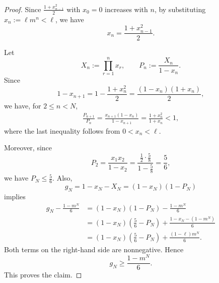 \documentclass[10pt,a4paper]{amsart}
\begin{document}
\begin{proof}
Since $\frac{1+x_{n-1}^2}{2}$ with $x_0=0$ increases with $n$, by substituting $x_n:=\ell m^n < \ell $, we have
\[
x_n
=\frac{1+x_{n-1}^2}{2}.
\]

Let
\[
X_n:=\prod_{r=1}^n x_r,
\qquad
P_n:=\frac{X_n}{1-x_n}.
\]
Since
\[
1-x_{n+1}
=
1-\frac{1+x_n^2}{2}
=
\frac{(1-x_n)(1+x_n)}{2},
\]
we have, for \(2\le n<N\),
\[
\begin{aligned}
\frac{P_{n+1}}{P_n}
=
\frac{x_{n+1}(1-x_n)}{1-x_{n+1}} =
\frac{1+x_n^2}{1+x_n}
<1,
\end{aligned}
\]
where the last inequality follows from \(0<x_n<\ell\).

Moreover, since
\[
P_2
=
\frac{x_1x_2}{1-x_2}
=
\frac{\frac12\cdot\frac58}{1-\frac58}
=
\frac56,
\]
we have $P_N \le \frac{5}{6}$. Also,
\[
g_N
=
1-x_N-X_N
=
(1-x_N)(1-P_N)
\]
 implies
\[
\begin{aligned}
g_N-\frac{1-m^N}{6}
&=
(1-x_N)(1-P_N)-\frac{1-m^N}{6} \\
&=
(1-x_N)\left(\frac56-P_N\right)
 +\frac{1-x_N-(1-m^N)}{6} \\
&=
(1-x_N)\left(\frac56-P_N\right)
 +\frac{(1-\ell)m^N}{6}.
\end{aligned}
\]
Both terms on the right-hand side are nonnegative. Hence
\[
g_N\ge \frac{1-m^N}{6}.
\]
This proves the claim.
\end{proof}
\end{document}
